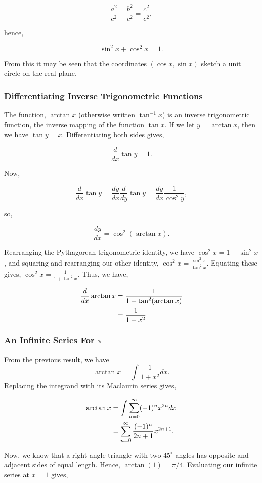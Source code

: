 \documentclass[11pt]{amsart}
\begin{document}
$$\frac{a^2}{c^2} + \frac{b^2}{c^2} = \frac{c^2}{c^2},$$

hence,

$$\sin^2x + \cos^2x = 1.$$

From this it may be seen that the coordinates $(\cos x, \sin x)$ sketch a unit circle on the real plane.

\subsubsection{Differentiating Inverse Trigonometric Functions}

The function, $\arctan x$ (otherwise written $\tan^{-1}x$) is an inverse trigonometric function, the inverse mapping of the function $\tan{x}$. If we let $y = \arctan{x}$, then we have $\tan{y} = x$. Differentiating both sides gives,

$$\frac{d}{dx} \tan{y} = 1.$$

Now,

$$\frac{d}{dx} \tan{y} = \frac{dy}{dx}\frac{d}{dy}\tan{y} = \frac{dy}{dx} \frac{1}{\cos^2{y}},$$

so,

$$\frac{dy}{dx} = \cos^2(\arctan{x}).$$

Rearranging the Pythagorean trigonometric identity, we have $\cos^2 x = 1 - \sin^2x$, and squaring and rearranging our other identity, $\cos^2{x} = \frac{\sin^2{x}}{\tan^2{x}}$. Equating these gives, $\cos^2x = \frac{1}{1 + \tan^2x}$. Thus, we have,

\begin{align}
\frac{d}{dx}\arctan{x} &= \frac{1}{1 + \tan^2(\arctan{x})} \notag \\
&= \frac{1}{1 + x^2} \notag
\end{align}

\subsubsection{An Infinite Series For $\pi$}

From the previous result, we have $$\arctan{x} = \int \frac{1}{1 + x^2} dx.$$ Replacing the integrand with its Maclaurin series gives,

\begin{align}
\arctan{x} &= \int \sum_{n=0}^{\infty} (-1)^nx^{2n} dx \notag \\
&= \sum_{n=0}^{\infty} \frac{(-1)^n}{2n + 1}x^{2n+1}. \notag
\end{align}

Now, we know that a right-angle triangle with two $45^{\circ}$ angles has opposite and adjacent sides of equal length. Hence, $\arctan({1}) = \pi/4$. Evaluating our infinite series at $x = 1$ gives,
\end{document}
